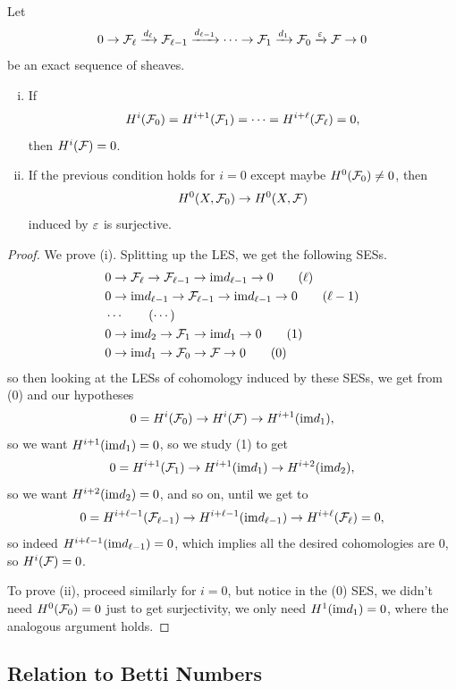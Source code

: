 \documentclass[12pt]{article}
\begin{document}
\begin{lem}
    Let
    \[0\to \mathcal{F}_\ell \xrightarrow{d_{\ell}} \mathcal{F}_{\ell-1} \xrightarrow{d_{\ell-1}} \cdots \to \mathcal{F}_1 \xrightarrow{d_1} \mathcal{F}_0 \xrightarrow{\varepsilon} \mathcal{F} \to 0\]
    be an exact sequence of sheaves.

    \begin{enumerate}[(i)]
        \item If
        \[H^i(\mathcal{F}_0)=H^{i+1}(\mathcal{F}_1)=\cdots=H^{i+\ell}(\mathcal{F}_\ell)=0,\]
        then $H^i(\mathcal{F})=0$.
        \item If the previous condition holds for $i=0$ except maybe $H^0(\mathcal{F}_0)\neq 0$, then
        \[H^0(X,\mathcal{F}_0)\to H^0(X,\mathcal{F})\]
        induced by $\varepsilon$ is surjective.
    \end{enumerate}
\end{lem}

\begin{proof}
    We prove (i). Splitting up the LES, we get the following SESs.
    \begin{align*}
        & 0 \to \mathcal{F}_\ell \to \mathcal{F}_{\ell-1} \to \mathrm{im} d_{\ell-1}\to 0 \tag{$\ell$}\\
        & 0 \to \mathrm{im} d_{\ell-1} \to \mathcal{F}_{\ell-1} \to \mathrm{im} d_{\ell-1} \to 0 \tag{$\ell-1$}\\
        & \cdots \tag{$\cdots$}\\
        & 0 \to \mathrm{im} d_{2} \to \mathcal{F}_{1} \to \mathrm{im} d_{1} \to 0 \tag{1}\\
        & 0 \to \mathrm{im} d_{1} \to \mathcal{F}_{0} \to \mathcal{F} \to 0 \tag{0}
    \end{align*}
    so then looking at the LESs of cohomology induced by these SESs, we get from (0) and our hypotheses
    \[0 = H^i(\mathcal{F}_0) \to H^i(\mathcal{F}) \to H^{i+1}(\mathrm{im} d_1),\]
    so we want $H^{i+1}(\mathrm{im} d_1)=0$, so we study (1) to get
    \[0 = H^{i+1}(\mathcal{F}_1)\to H^{i+1}(\mathrm{im} d_1) \to H^{i+2}(\mathrm{im} d_2),\]
    so we want $H^{i+2}(\mathrm{im} d_2)=0$, and so on, until we get to
    \[0 = H^{i+\ell-1}(\mathcal{F}_{\ell-1}) \to H^{i+\ell-1}(\mathrm{im} d_{\ell-1}) \to H^{i+\ell}(\mathcal{F}_\ell)=0,\]
    so indeed $H^{i+\ell-1}(\mathrm{im} d_{\ell-1})=0$, which implies all the desired cohomologies are 0, so $H^{i}(\mathcal{F})=0$.

    To prove (ii), proceed similarly for $i=0$, but notice in the (0) SES, we didn't need $H^0(\mathcal{F}_0)=0$ just to get surjectivity, we only need $H^1(\mathrm{im} d_1)=0$, where the analogous argument holds.
\end{proof}

\subsection{Relation to Betti Numbers}
\end{document}
